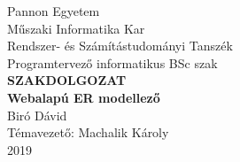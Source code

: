 \begin{center}
{
    \Large Pannon Egyetem\\
    Műszaki Informatika Kar\\
    Rendszer- és Számítástudományi Tanszék
    \vspace*{3mm}\\
    Programtervező informatikus BSc szak
}
    \vspace*{2cm}\\
    {\LARGE \bf SZAKDOLGOZAT}
    \vspace{3cm}\\
    {\LARGE\bf Webalapú ER modellező}
    \vspace{3cm}\\
    {\large Biró Dávid}
    \vspace{6cm}
    \\
    {\large Témavezető: Machalik Károly}
    \vspace{1cm}\\
    {\large 2019}
\end{center}
\normalsize
